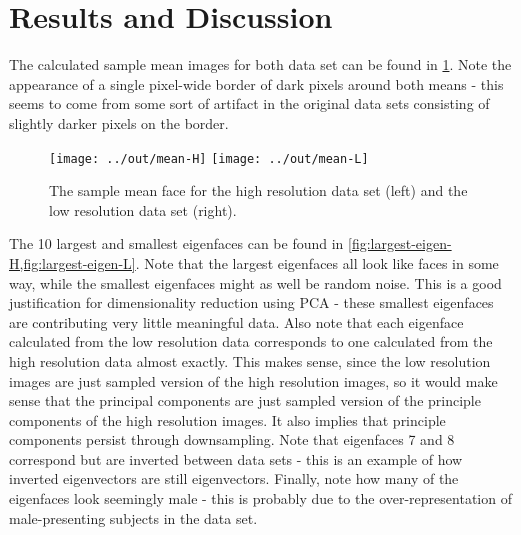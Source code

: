 \documentclass[headings=optiontoheadandtoc,listof=totoc,parskip=full]{scrartcl}
\begin{document}
\section{Results and Discussion}
\label{sec:results}

The calculated sample mean images for both data set can be found in \cref{fig:sample-means}. Note the appearance of a single pixel-wide border of dark pixels around both means - this seems to come from some sort of artifact in the original data sets consisting of slightly darker pixels on the border.

\begin{figure}[H]
	\centering
	\texttt{[image: ../out/mean-H]} \qquad
	\texttt{[image: ../out/mean-L]}
	\caption{The sample mean face for the high resolution data set (left) and the low resolution data set (right).}
	\label{fig:sample-means}
\end{figure}

The 10 largest and smallest eigenfaces can be found in \cref{fig:largest-eigen-H,fig:largest-eigen-L}. Note that the largest eigenfaces all look like faces in some way, while the smallest eigenfaces might as well be random noise. This is a good justification for dimensionality reduction using PCA - these smallest eigenfaces are contributing very little meaningful data. Also note that each eigenface calculated from the low resolution data corresponds to one calculated from the high resolution data almost exactly. This makes sense, since the low resolution images are just sampled version of the high resolution images, so it would make sense that the principal components are just sampled version of the principle components of the high resolution images. It also implies that principle components persist through downsampling. Note that eigenfaces 7 and 8 correspond but are inverted between data sets - this is an example of how inverted eigenvectors are still eigenvectors. Finally, note how many of the eigenfaces look seemingly male - this is probably due to the over-representation of male-presenting subjects in the data set.
\end{document}
